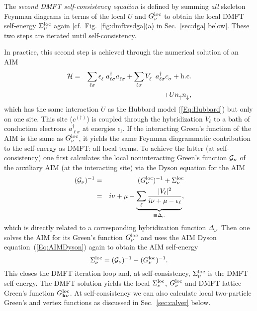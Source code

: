 \documentclass[rmp,aps,reprint,amsmath,amssymb,superscriptaddress,showpacs,nofootinbib]{revtex4-1}
\begin{document}
The {\em second DMFT self-consistency equation} is defined by summing {\em all} skeleton Feynman diagrams in terms of the local $U$  and $G^{\rm loc}_\nu$ to obtain the local DMFT self-energy   $\Sigma^{\rm loc}_\nu$ again [cf.\ Fig.~\ref{fig:dmftvsdga}(a) in Sec.~\ref{sec:dga} below]. These two steps are iterated until self-consistency.

In practice, this second step is achieved through the numerical solution of an AIM
\begin{eqnarray}
\mathcal{H}&=& \sum_{\ell\sigma} \epsilon^{\phantom{\dagger}}_{\ell} \; a_{{\ell}\sigma}^{\dagger}a_{{\ell}\sigma}^{\phantom{\dagger}}  +  \sum_{\ell\sigma}  V^{\phantom{\dagger}}_{\ell} \;  a_{{\ell}\sigma}^{\dagger} c_{\sigma}^{\phantom{\dagger}}  + {\rm h.c.}  \nonumber \\ && + U n^{\phantom{\dagger}}_{\uparrow}n^{\phantom{\dagger}}_{\downarrow},
\label{Eq:AIM}
\end{eqnarray}
which has the same interaction $U$ as the Hubbard model (\ref{Eq:Hubbard}) but only on one site. This site ($c^{(\dagger)}$) is coupled through the hybridization $V_{\ell}$ to a bath of conduction electrons  $a_{\ell\sigma}^{\dagger}$ at energies  $\epsilon_{\ell}$. If the interacting Green's function of the AIM is the same as $G^{\rm loc}_\nu$, it yields the same Feynman diagrammatic contribution to the self-energy as DMFT: all local terms. To achieve the latter (at self-consistency) one first calculates the local noninteracting Green's function ${\cal G}_\nu$ of the auxiliary AIM (at  the interacting site)
via the Dyson equation for the AIM
\begin{eqnarray}
\label{Eq:DMFTDelta}
({\cal G}_\nu)^{-1} &=& (G^{\rm loc}_\nu)^{-1}+\Sigma^{\rm loc}_\nu \label{Eq:AIMDyson}  \\&=&i\nu+\mu-\underbrace{\sum_{\ell}\frac{|V_\ell|^2}{i\nu+\mu- \epsilon_{\ell}}}_{\equiv \Delta_{\nu}},
\end{eqnarray}
which is directly related to a  corresponding hybridization function $\Delta_{\nu}$. Then one solves the AIM for its Green's function  $G^{\rm loc}_\nu$ and uses the AIM Dyson equation~(\ref{Eq:AIMDyson}) again to obtain the AIM self-energy 
\begin{equation}
\Sigma^{\rm loc}_\nu = ({\cal G}_\nu)^{-1}- (G^{\rm loc}_\nu)^{-1}.
\end{equation}
This  closes the DMFT iteration loop and, at self-consistency, $\Sigma^{\rm loc}_\nu$ is the DMFT self-energy.
The DMFT solution yields the local $\Sigma^{\rm loc}_\nu$, $G^{\rm loc}_\nu$ and DMFT lattice Green's function
$G^{\rm loc}_{\mathbf k \nu}$. At self-consistency we can also calculate  local two-particle Green's and vertex functions as discussed in Sec.~\ref{sec:calver} below.
\end{document}
